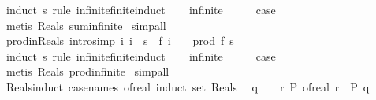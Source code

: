 \begin{isabellebody}
%
\isadelimproof
%
\endisadelimproof
%
\isatagproof
{}\isamarkupfalse%
\ {\isacharparenleft}{\kern0pt}induct\ s\ rule{\isacharcolon}{\kern0pt}\ infinite{\isacharunderscore}{\kern0pt}finite{\isacharunderscore}{\kern0pt}induct{\isacharparenright}{\kern0pt}\isanewline
\ \ \isamarkupfalse%
\ infinite\isanewline
\ \ \isamarkupfalse%
\ \isamarkupfalse%
\ {\isacharquery}{\kern0pt}case\ \isamarkupfalse%
\ {\isacharparenleft}{\kern0pt}metis\ Reals{\isacharunderscore}{\kern0pt}{}\ sum{\isachardot}{\kern0pt}infinite{\isacharparenright}{\kern0pt}\isanewline
{}\isamarkupfalse%
\ simp{\isacharunderscore}{\kern0pt}all%
\endisatagproof
{\isafoldproof}%
%
\isadelimproof
\isanewline
%
\endisadelimproof
\isanewline
{}\isamarkupfalse%
\ prod{\isacharunderscore}{\kern0pt}in{\isacharunderscore}{\kern0pt}Reals\ {\isacharbrackleft}{\kern0pt}intro{\isacharcomma}{\kern0pt}simp{\isacharbrackright}{\kern0pt}{\isacharcolon}{\kern0pt}\ {\isachardoublequoteopen}{\isacharparenleft}{\kern0pt}{\isasymAnd}i{\isachardot}{\kern0pt}\ i\ {\isasymin}\ s\ {\isasymLongrightarrow}\ f\ i\ {\isasymin}\ {\isasymreal}{\isacharparenright}{\kern0pt}\ {\isasymLongrightarrow}\ prod\ f\ s\ {\isasymin}\ {\isasymreal}{\isachardoublequoteclose}\isanewline
%
\isadelimproof
%
\endisadelimproof
%
\isatagproof
{}\isamarkupfalse%
\ {\isacharparenleft}{\kern0pt}induct\ s\ rule{\isacharcolon}{\kern0pt}\ infinite{\isacharunderscore}{\kern0pt}finite{\isacharunderscore}{\kern0pt}induct{\isacharparenright}{\kern0pt}\isanewline
\ \ \isamarkupfalse%
\ infinite\isanewline
\ \ \isamarkupfalse%
\ \isamarkupfalse%
\ {\isacharquery}{\kern0pt}case\ \isamarkupfalse%
\ {\isacharparenleft}{\kern0pt}metis\ Reals{\isacharunderscore}{\kern0pt}{}\ prod{\isachardot}{\kern0pt}infinite{\isacharparenright}{\kern0pt}\isanewline
{}\isamarkupfalse%
\ simp{\isacharunderscore}{\kern0pt}all%
\endisatagproof
{\isafoldproof}%
%
\isadelimproof
\isanewline
%
\endisadelimproof
\isanewline
{}\isamarkupfalse%
\ Reals{\isacharunderscore}{\kern0pt}induct\ {\isacharbrackleft}{\kern0pt}case{\isacharunderscore}{\kern0pt}names\ of{\isacharunderscore}{\kern0pt}real{\isacharcomma}{\kern0pt}\ induct\ set{\isacharcolon}{\kern0pt}\ Reals{\isacharbrackright}{\kern0pt}{\isacharcolon}{\kern0pt}\isanewline
\ \ {\isachardoublequoteopen}q\ {\isasymin}\ {\isasymreal}\ {\isasymLongrightarrow}\ {\isacharparenleft}{\kern0pt}{\isasymAnd}r{\isachardot}{\kern0pt}\ P\ {\isacharparenleft}{\kern0pt}of{\isacharunderscore}{\kern0pt}real\ r{\isacharparenright}{\kern0pt}{\isacharparenright}{\kern0pt}\ {\isasymLongrightarrow}\ P\ q{\isachardoublequoteclose}\isanewline

\end{isabellebody}
